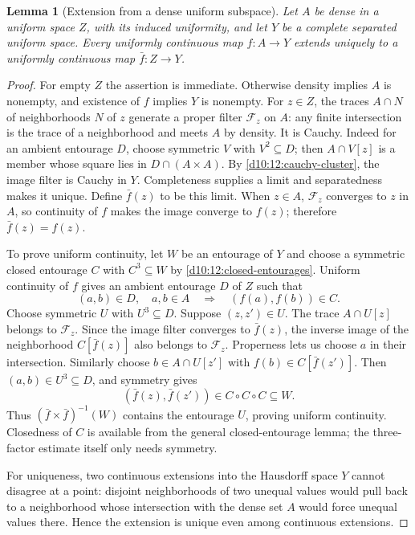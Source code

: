 \documentclass[11pt,oneside,openany]{book}
\newtheorem{lemma}[theorem]{Lemma}
\theoremstyle{definition}
\theoremstyle{remark}
\begin{document}
\begin{lemma}[Extension from a dense uniform subspace]\label{d10:12:dense-extension}
Let $A$ be dense in a uniform space $Z$, with its induced uniformity, and let $Y$ be a complete separated uniform space. Every uniformly continuous map $f:A\to Y$ extends uniquely to a uniformly continuous map $\bar f:Z\to Y$.
\end{lemma}
\begin{proof}
For empty $Z$ the assertion is immediate. Otherwise density implies $A$ is nonempty, and existence of $f$ implies $Y$ is nonempty. For $z\in Z$, the traces $A\cap N$ of neighborhoods $N$ of $z$ generate a proper filter $\mathcal F_z$ on $A$: any finite intersection is the trace of a neighborhood and meets $A$ by density. It is Cauchy. Indeed for an ambient entourage $D$, choose symmetric $V$ with $V^2\subseteq D$; then $A\cap V[z]$ is a member whose square lies in $D\cap(A\times A)$. By \cref{d10:12:cauchy-cluster}, the image filter is Cauchy in $Y$. Completeness supplies a limit and separatedness makes it unique. Define $\bar f(z)$ to be this limit. When $z\in A$, $\mathcal F_z$ converges to $z$ in $A$, so continuity of $f$ makes the image converge to $f(z)$; therefore $\bar f(z)=f(z)$.

To prove uniform continuity, let $W$ be an entourage of $Y$ and choose a symmetric closed entourage $C$ with $C^3\subseteq W$ by \cref{d10:12:closed-entourages}. Uniform continuity of $f$ gives an ambient entourage $D$ of $Z$ such that
\[
 (a,b)\in D,\quad a,b\in A\quad\Longrightarrow\quad(f(a),f(b))\in C.
\]
Choose symmetric $U$ with $U^3\subseteq D$. Suppose $(z,z')\in U$. The trace $A\cap U[z]$ belongs to $\mathcal F_z$. Since the image filter converges to $\bar f(z)$, the inverse image of the neighborhood $C[\bar f(z)]$ also belongs to $\mathcal F_z$. Properness lets us choose $a$ in their intersection. Similarly choose $b\in A\cap U[z']$ with $f(b)\in C[\bar f(z')]$. Then $(a,b)\in U^3\subseteq D$, and symmetry gives
\[
 (\bar f(z),\bar f(z'))\in C\circ C\circ C\subseteq W.
\]
Thus $(\bar f\times\bar f)^{-1}(W)$ contains the entourage $U$, proving uniform continuity. Closedness of $C$ is available from the general closed-entourage lemma; the three-factor estimate itself only needs symmetry.

For uniqueness, two continuous extensions into the Hausdorff space $Y$ cannot disagree at a point: disjoint neighborhoods of two unequal values would pull back to a neighborhood whose intersection with the dense set $A$ would force unequal values there. Hence the extension is unique even among continuous extensions.
\end{proof}
\end{document}
